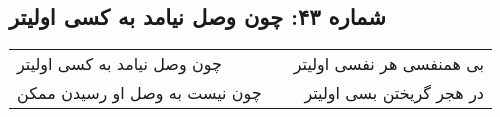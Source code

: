 \begin{center}
\section*{شماره ۴۳: چون وصل نیامد به کسی اولیتر}
\label{sec:043}
\begin{longtable}{l p{0.5cm} r}
چون وصل نیامد به کسی اولیتر
&&
بی همنفسی هر نفسی اولیتر
\\
چون نیست به وصل او رسیدن ممکن
&&
در هجر گریختن بسی اولیتر
\\
\end{longtable}
\end{center}

